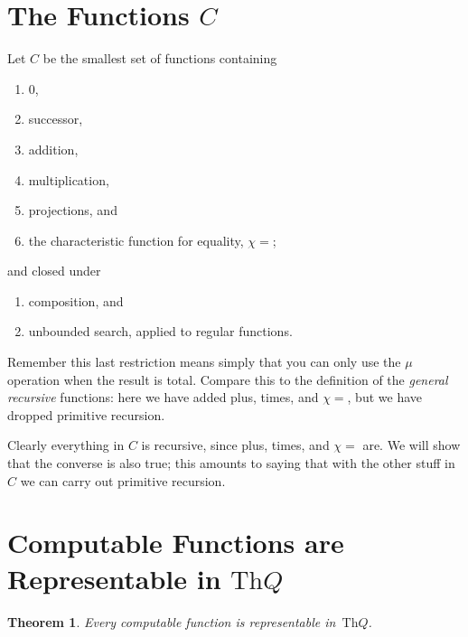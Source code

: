 \documentclass[10pt,a4paper]{article}
\theoremstyle{plain}
\newtheorem{thm}{Theorem}[section]
\theoremstyle{definition}
\theoremstyle{remark}
\newcommand*{\olfileid}[3]{}
\newcommand*{\olsection}[1]{\section*{#1}}
\providecommand{\Th}{\ensuremath{\mathrm{Th}}}
\providecommand{\Char}{\chi}
\begin{document}



\olfileid{inc}{req}{cee}
\olsection{The Functions $C$}

Let $C$ be the smallest set of functions containing
\begin{enumerate}
\item $0$,
\item successor,
\item addition,
\item multiplication,
\item projections, and
\item the characteristic function for equality, $\Char{=}$;
\end{enumerate}
and closed under
\begin{enumerate}
\item composition, and
\item unbounded search, applied to regular
functions.
\end{enumerate}
Remember this last restriction means simply that you can only use the
$\mu$ operation when the result is total. Compare this to the
definition of the \emph{general recursive} functions: here we have
added plus, times, and $\Char{=}$, but we have dropped primitive
recursion.

Clearly everything in $C$ is recursive, since plus, times,
and $\Char{=}$ are. We will show that the converse is also true; this
amounts to saying that with the other stuff in $C$ we can carry out
primitive recursion.





\olfileid{inc}{req}{crq}
\olsection{Computable Functions are Representable in $\Th{Q}$}

\begin{thm}
Every computable function is representable in~$\Th{Q}$.
\end{thm}
\end{document}

